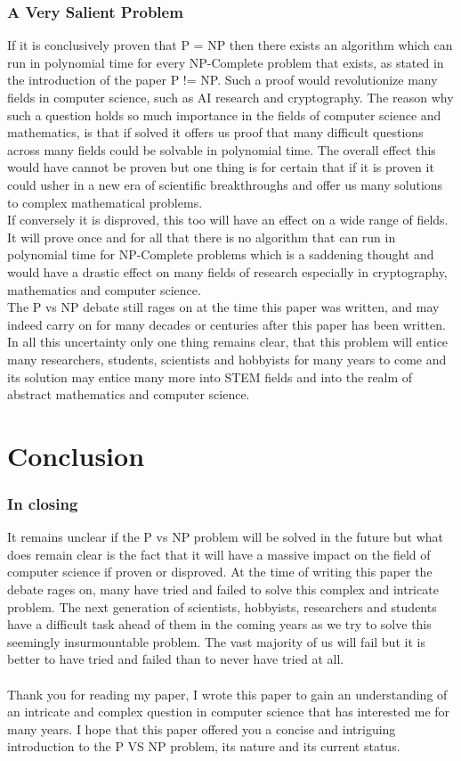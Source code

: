 \documentclass{report}
\begin{document}
\subsection{A Very Salient Problem}
If it is conclusively proven that P = NP then there exists an algorithm which can run in polynomial time for every NP-Complete problem that exists, as stated in the introduction of the paper P != NP\cite{P!=NP}.  Such a proof would revolutionize many fields in computer science, such as AI research and cryptography.  The reason why such a question holds so much importance in the fields of computer science and mathematics, is that if solved it offers us proof that many difficult questions across many fields could be solvable in polynomial time.  The overall effect this would have cannot be proven but one thing is for certain that if it is proven it could usher in a new era of scientific breakthroughs and offer us many solutions to complex mathematical problems.
\\
If conversely it is disproved, this too will have an effect on a wide range of fields.  It will prove once and for all that there is no algorithm that can run in polynomial time for NP-Complete problems which is a saddening thought and would have a drastic effect on many fields of research especially in cryptography, mathematics and computer science.
\\
The P vs NP debate still rages on at the time this paper was written, and may indeed carry on for many decades or centuries after this paper has been written.  In all this uncertainty only one thing remains clear, that this problem will entice many researchers, students, scientists and hobbyists for many years to come and its solution may entice many more into STEM fields and into the realm of abstract mathematics and computer science.
\chapter{Conclusion}
\subsection{In closing}
It remains unclear if the P vs NP problem will be solved in the future but what does remain clear is the fact that it will have a massive impact on the field of computer science if proven or disproved.  At the time of writing this paper the debate rages on, many have tried and failed to solve this complex and intricate problem.  The next generation of scientists, hobbyists, researchers and students have a difficult task ahead of them in the coming years as we try to solve this seemingly insurmountable problem.  The vast majority of us will fail but it is better to have tried and failed than to never have tried at all.
\\
\\
Thank you for reading my paper, I wrote this paper to gain an understanding of an intricate and complex question in computer science that has interested me for many years.  I hope that this paper offered you a concise and intriguing introduction to the P VS NP problem, its nature and its current status.


\end{document}
